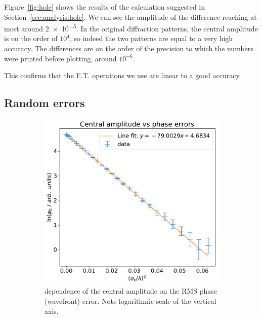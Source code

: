 \documentclass{article}
\begin{document}
Figure~\ref{fig:hole} shows the results of the calculation suggested in Section~\ref{sec:analysis:hole}. We can see the amplitude of the difference reaching at most around \num{2e-5}. In the original diffraction patterns, the central amplitude is on the order of $10^4$, so indeed the two patterns are equal to a very high accuracy. The differences are on the order of the precision to which the numbers were printed before plotting, around $10^{-6}$.

This confirms that the F.T. operations we use are linear to a good accuracy.

\subsection{Random errors}\label{sec:res:rand}
\begin{figure}
    \centering
    \begin{subfigure}{0.45\textwidth}
        \centering
        \includegraphics[width=\textwidth]{pictures/rand/int}
        \caption{dependence of the central amplitude on the RMS phase (wavefront) error. Note logarithmic scale of the vertical axis.}\label{fig:rand:int}
    \end{subfigure}%
    \hfill
    \begin{subfigure}{0.45\textwidth}
        \centering

\end{subfigure}
\end{figure}
\end{document}
